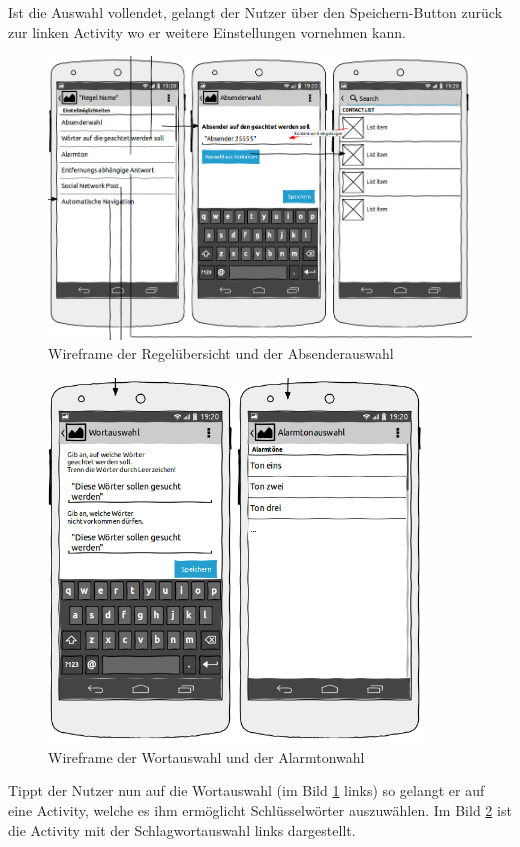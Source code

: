 Ist die Auswahl vollendet, gelangt der Nutzer \"uber den Speichern-Button zur\"uck zur linken Activity wo er weitere Einstellungen vornehmen kann.
\begin{figure}[!ht]
\centering
\includegraphics[width=16cm]{Bilder/WireframeRegeluebersicht.png}
\caption{Wireframe der Regel\"ubersicht und der Absenderauswahl}
\label{Wireframe Regeluebersicht}
\centering
\end{figure}

\newpage

 
\begin{figure}
\vspace{-13pt}
\includegraphics[width=10cm]{Bilder/WireframeWortwahl.png}
\caption{Wireframe der Wortauswahl und der Alarmtonwahl}
\label{Wireframe Wortauswahl}
\vspace{-20pt}
\end{figure}
Tippt der Nutzer nun auf die Wortauswahl (im Bild \ref{Wireframe Regeluebersicht} links) so gelangt er auf eine Activity, welche es ihm erm\"oglicht Schl\"usselw\"orter auszuw\"ahlen. Im Bild \ref{Wireframe Wortauswahl} ist die Activity mit der Schlagwortauswahl links dargestellt. 

